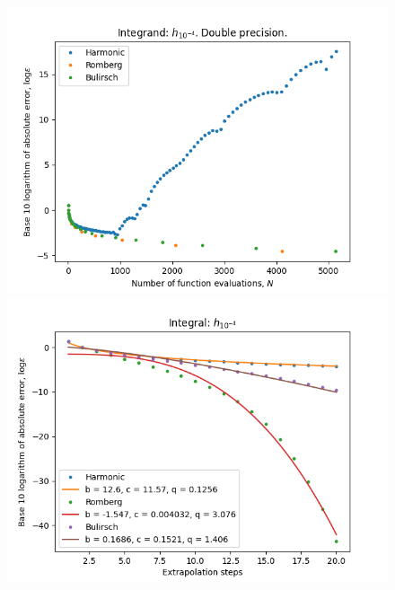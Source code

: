 \begin{figure}[H]
\centering
\begin{minipage}{0.45\textwidth}
\centering
\includegraphics[scale=0.45]{romberg_plots/h_tenthousandth.png}
\end{minipage}
\begin{minipage}{0.45\textwidth}
\centering
\includegraphics[scale=0.45]{romberg_plots/h_tenthousandth_hp_steps.png}
\end{minipage}
\end{figure}

